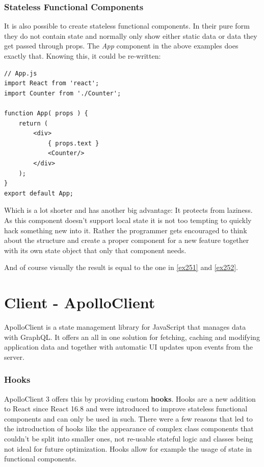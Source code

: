 \subsubsection{Stateless Functional Components}
It is also possible to create stateless functional components. In their pure form they do not contain state and normally only show either static data or data they get passed through props. The \emph{App} component in the above examples does exactly that. Knowing this, it could be re-written:
\begin{lstlisting}[caption={App as Functional Component}]
// App.js
import React from 'react';
import Counter from './Counter';

function App( props ) {
	return (
		<div>
			{ props.text }
			<Counter/>
		</div>
	);
}
export default App;
\end{lstlisting}
Which is a lot shorter and has another big advantage: It protects from laziness. \cite{CoryHouse} As this component doesn't support local state it is not too tempting to quickly hack something new into it. Rather the programmer gets encouraged to think about the structure and create a proper component for a new feature together with its own state object that only that component needs.

And of course visually the result is equal to the one in \autoref{ex251} and \autoref{ex252}.

\section{Client - ApolloClient}
ApolloClient is a state management library for JavaScript that manages data with GraphQL. It offers an all in one solution for fetching, caching and modifying application data and together with automatic UI updates upon events from the server. \cite{ApolloClientIntro}

\subsubsection{Hooks}
ApolloClient 3 offers this by providing custom \textbf{hooks}. Hooks are a new addition to React since React 16.8 and were introduced to improve stateless functional components \cite{ReactHooksIntro} and can only be used in such. \cite{ReactHooksOverview} There were a few reasons that led to the introduction of hooks like the appearance of complex class components that couldn't be split into smaller ones, not re-usable stateful logic and classes being not ideal for future optimization. \cite{ReactHooksIntro} Hooks allow for example the usage of state in functional components.

